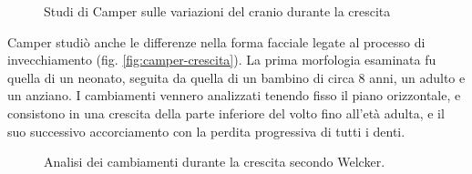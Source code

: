\begin{figure}
 \centering
 \caption{Studi di Camper sulle variazioni del cranio durante la crescita}
 \label{fig:camper-crescita}
\end{figure}

Camper studiò anche le differenze nella forma facciale legate al processo di invecchiamento (fig. \vref{fig:camper-crescita}). La prima morfologia esaminata fu quella di un neonato, seguita da quella di un bambino di circa 8 anni, un adulto e un anziano. I cambiamenti vennero analizzati tenendo fisso il piano orizzontale, e consistono in una crescita della parte inferiore del volto fino all'età adulta, e il suo successivo accorciamento con la perdita progressiva di tutti i denti.

\begin{figure}
 \centering
 \caption{Analisi dei cambiamenti durante la crescita secondo Welcker.}
 \label{fig:welcker}
\end{figure}

